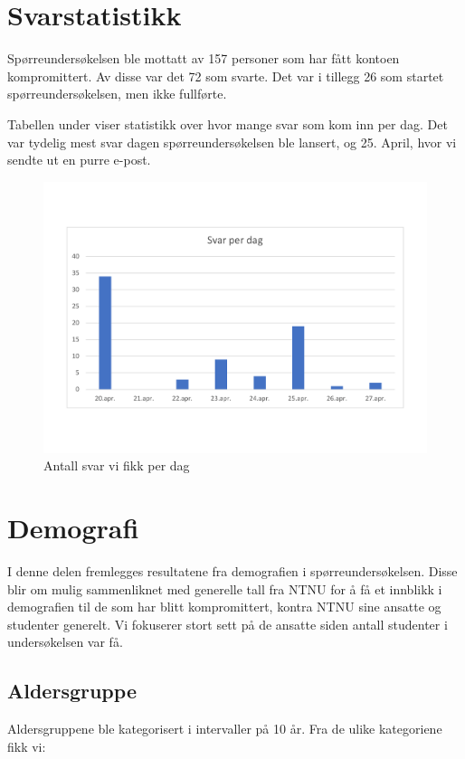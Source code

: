 \section{Svarstatistikk}
Spørreundersøkelsen ble mottatt av 157 personer som har fått kontoen kompromittert. Av disse var det 72 som svarte. Det var i tillegg 26 som startet spørreundersøkelsen, men ikke fullførte. 

Tabellen under viser statistikk over hvor mange svar som kom inn per dag. Det var tydelig mest svar dagen spørreundersøkelsen ble lansert, og 25. April, hvor vi sendte ut en purre e-post. 
\begin{figure}[H]
    \centering
    \includegraphics[scale=0.5, clip, trim=1cm 3cm 0cm 3cm]{case_2/bilder/spss/svar_per_dag.pdf}
    \caption[Svar per dag]{Antall svar vi fikk per dag}
    \label{fig:boks}
\end{figure}


\section{Demografi}
I denne delen fremlegges resultatene fra demografien i spørreundersøkelsen. Disse blir om mulig sammenliknet med generelle tall fra NTNU for å få et innblikk i demografien til de som har blitt kompromittert, kontra NTNU sine ansatte og studenter generelt. Vi fokuserer stort sett på de ansatte siden antall studenter i undersøkelsen var få.

\subsection{Aldersgruppe}
Aldersgruppene ble kategorisert i intervaller på 10 år. Fra de ulike kategoriene fikk vi:

